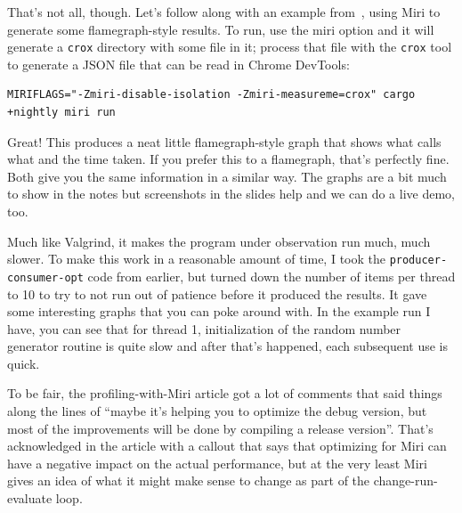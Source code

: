That's not all, though. Let's follow along with an example from~\cite{miri}, using Miri to generate some flamegraph-style results. To run, use the miri option and it will generate a \texttt{crox} directory with some file in it; process that file with the \texttt{crox} tool to generate a JSON file that can be read in Chrome DevTools:

\begin{lstlisting}
MIRIFLAGS="-Zmiri-disable-isolation -Zmiri-measureme=crox" cargo +nightly miri run
\end{lstlisting}

Great! This produces a neat little flamegraph-style graph that shows what calls what and the time taken. If you prefer this to a flamegraph, that's perfectly fine. Both give you the same information in a similar way. The graphs are a bit much to show in the notes but screenshots in the slides help and we can do a live demo, too.

Much like Valgrind, it makes the program under observation run much, much slower. To make this work in a reasonable amount of time, I took the \texttt{producer-consumer-opt} code from earlier, but turned down the number of items per thread to 10 to try to not run out of patience before it produced the results. It gave some interesting graphs that you can poke around with. In the example run I have, you can see that for thread 1, initialization of the random number generator routine is quite slow and after that's happened, each subsequent use is quick. 


To be fair, the profiling-with-Miri article got a lot of comments that said things along the lines of ``maybe it's helping you to optimize the debug version, but most of the improvements will be done by compiling a release version''. That's acknowledged in the article with a callout that says that optimizing for Miri can have a negative impact on the actual performance, but at the very least Miri gives an idea of what it might make sense to change as part of the change-run-evaluate loop.




